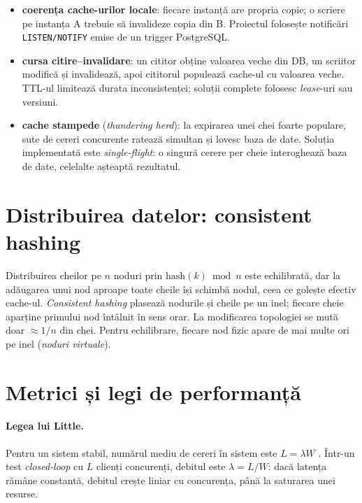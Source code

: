 \begin{itemize}
  \item \textbf{coerența cache-urilor locale}: fiecare instanță are propria copie; o scriere pe instanța A
        trebuie să invalideze copia din B. Proiectul folosește notificări \texttt{LISTEN/NOTIFY} emise de
        un trigger PostgreSQL.
  \item \textbf{cursa citire–invalidare}: un cititor obține valoarea veche din DB, un scriitor modifică și
        invalidează, apoi cititorul populează cache-ul cu valoarea veche. TTL-ul limitează durata
        inconsistenței; soluții complete folosesc \emph{lease}-uri \cite{memcache-fb} sau versiuni.
  \item \textbf{cache stampede} (\emph{thundering herd}): la expirarea unei chei foarte populare, sute de
        cereri concurente ratează simultan și lovesc baza de date. Soluția implementată este
        \emph{single-flight}: o singură cerere per cheie interoghează baza de date, celelalte așteaptă
        rezultatul.
\end{itemize}

\section{Distribuirea datelor: consistent hashing}

Distribuirea cheilor pe $n$ noduri prin $\text{hash}(k) \bmod n$ este echilibrată, dar la adăugarea unui
nod aproape toate cheile își schimbă nodul, ceea ce golește efectiv cache-ul. \emph{Consistent hashing}
\cite{karger} plasează nodurile și cheile pe un inel; fiecare cheie aparține primului nod întâlnit în
sens orar. La modificarea topologiei se mută doar $\approx 1/n$ din chei. Pentru echilibrare, fiecare nod
fizic apare de mai multe ori pe inel (\emph{noduri virtuale}).

\section{Metrici și legi de performanță}

\paragraph{Legea lui Little.} Pentru un sistem stabil, numărul mediu de cereri în sistem este
$L = \lambda W$ \cite{little}. Într-un test \emph{closed-loop} cu $L$ clienți concurenți, debitul este
$\lambda = L / W$: dacă latența rămâne constantă, debitul crește liniar cu concurența, până la saturarea
unei resurse.

